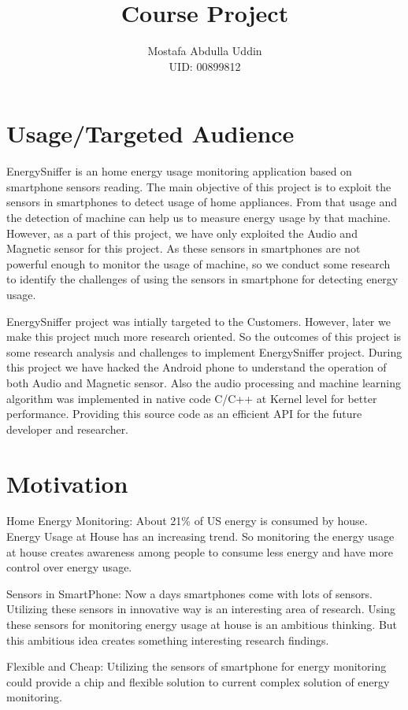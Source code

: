 \documentclass[11pt]{amsart}
\title{Course Project}
\author{Mostafa Abdulla Uddin\\
UID: 00899812}
\begin{document}



\section{Usage/Targeted Audience}

EnergySniffer is an home energy usage monitoring application based on smartphone sensors reading. The main objective of this project is to exploit the sensors in smartphones to detect usage of home appliances. From that usage and the detection of machine can help us to measure energy usage by that machine. However, as a part of this project, we have only exploited the Audio and Magnetic sensor for this project. As these sensors in smartphones are not powerful enough to monitor the usage of machine, so we conduct some research to identify the challenges of using the sensors in smartphone for detecting energy usage. 

EnergySniffer project was intially targeted to the Customers. However, later we make this project much more research oriented. So the outcomes of this project is some research analysis and challenges to implement EnergySniffer project. During this project we have hacked the Android phone to understand the operation of both Audio and Magnetic sensor. Also the audio processing and machine learning algorithm was implemented in native code C/C++ at Kernel level for better performance. Providing this source code as an efficient API for the future developer and researcher.

\section{ Motivation}
\begin{itemize*}
\item Home Energy Monitoring: About 21\% of US energy is consumed by house. Energy Usage at House has an increasing trend. So monitoring the energy usage at house creates awareness among people to consume less energy and have more control over energy usage.
\item Sensors in SmartPhone: Now a days smartphones come with lots of sensors. Utilizing these sensors in innovative way is an interesting area of research. Using these sensors for monitoring energy usage at house is an ambitious thinking. But this ambitious idea creates something interesting research findings.
\item Flexible and Cheap: Utilizing the sensors of smartphone for energy monitoring could provide a chip and flexible solution to current complex solution of energy monitoring.

\end{itemize*}
\end{document}
